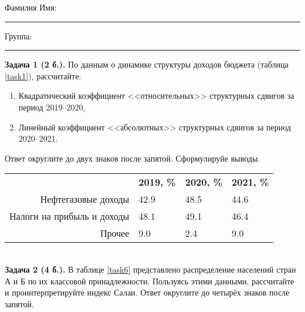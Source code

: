 \documentclass{article}
\begin{document}
\mbox{}

\vspace{-36pt}

\begin{center}
	\begin{tcolorbox}[colback=white, boxrule=0.20ex, sharp corners = all, height=25pt, colframe=black, valign=top]
		\begin{center}
			Фамилия Имя:\hspace{1.5pt}\rule{190pt}{0pt}\hspace{50pt}Группа:\hspace{1.5pt}\rule{60pt}{0pt}
		\end{center}
	\end{tcolorbox}
\end{center}
\vspace{3pt}

\textbf{Задача 1 (2 б.).} По данным о динамике структуры доходов бюджета (таблица \ref{task1}), рассчитайте:
\begin{enumerate}[leftmargin=40pt]
\item Квадратический коэффициент <<относительных>> структурных сдвигов за период 2019--2020,
\item Линейный коэффициент <<абсолютных>> структурных сдвигов за период 2020--2021.\medskip
\end{enumerate}

Ответ округлите до двух знаков после запятой. Сформулируйе выводы.\\

\begin{minipage}{\textwidth}
\centering
\begin{tabularx}{0.8\textwidth}{rYYY}
\toprule
 & \textbf{2019, \%} & \textbf{2020, \%} & \textbf{2021, \%} \\
\cmidrule(lr){2-2}\cmidrule(lr){3-3}\cmidrule(lr){4-4}
Нефтегазовые доходы & 42.9 & 48.5 & 44.6 \\

Налоги на прибыль и доходы & 48.1 & 49.1 & 46.4 \\

Прочее & 9.0 & 2.4 & 9.0 \\
\bottomrule
\end{tabularx}
\label{task1}
\end{minipage} \\[35pt]

\textbf{Задача 2 (4 б.).} В таблице \ref{task6} представлено распределение населений стран А и Б по их классовой принадлежности. Пользуясь этими данными, рассчитайте и проинтерпретируйте индекс Салаи. Ответ округлите до четырёх знаков после запятой.\\
\end{document}
